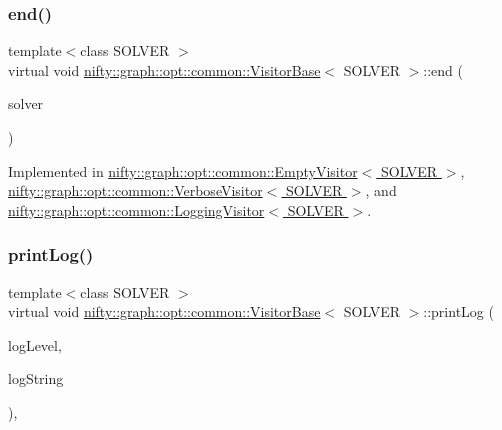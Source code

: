 \subsubsection{\texorpdfstring{end()}{end()}}
{\footnotesize\ttfamily template$<$class S\+O\+L\+V\+ER $>$ \\
virtual void \hyperlink{classnifty_1_1graph_1_1opt_1_1common_1_1VisitorBase}{nifty\+::graph\+::opt\+::common\+::\+Visitor\+Base}$<$ S\+O\+L\+V\+ER $>$\+::end (\begin{DoxyParamCaption}\item[{\hyperlink{classnifty_1_1graph_1_1opt_1_1common_1_1VisitorBase_a433d03139897d4aefe27315b2bbb3adc}{Solver\+Type} $\ast$}]{solver }\end{DoxyParamCaption})\hspace{0.3cm}{\ttfamily [pure virtual]}}



Implemented in \hyperlink{classnifty_1_1graph_1_1opt_1_1common_1_1EmptyVisitor_a08d9fee2b6eb515bbec2c2ff46d2d0f4}{nifty\+::graph\+::opt\+::common\+::\+Empty\+Visitor$<$ S\+O\+L\+V\+E\+R $>$}, \hyperlink{classnifty_1_1graph_1_1opt_1_1common_1_1VerboseVisitor_ab903991aacf3d9569949c0cce466e3d8}{nifty\+::graph\+::opt\+::common\+::\+Verbose\+Visitor$<$ S\+O\+L\+V\+E\+R $>$}, and \hyperlink{classnifty_1_1graph_1_1opt_1_1common_1_1LoggingVisitor_a8597af1625d5499fa13c1890d92052a0}{nifty\+::graph\+::opt\+::common\+::\+Logging\+Visitor$<$ S\+O\+L\+V\+E\+R $>$}.

\mbox{\label{classnifty_1_1graph_1_1opt_1_1common_1_1VisitorBase_ad9092d8387ff327b254df08ef97363a3}} 
\subsubsection{\texorpdfstring{print\+Log()}{printLog()}}
{\footnotesize\ttfamily template$<$class S\+O\+L\+V\+ER $>$ \\
virtual void \hyperlink{classnifty_1_1graph_1_1opt_1_1common_1_1VisitorBase}{nifty\+::graph\+::opt\+::common\+::\+Visitor\+Base}$<$ S\+O\+L\+V\+ER $>$\+::print\+Log (\begin{DoxyParamCaption}\item[{const \hyperlink{namespacenifty_1_1logging_a3385625f9a0dbb17f70c47d3fca2f64d}{nifty\+::logging\+::\+Log\+Level}}]{log\+Level,  }\item[{const std\+::string \&}]{log\+String }\end{DoxyParamCaption})\hspace{0.3cm}{\ttfamily [inline]}, {\ttfamily [virtual]}}



